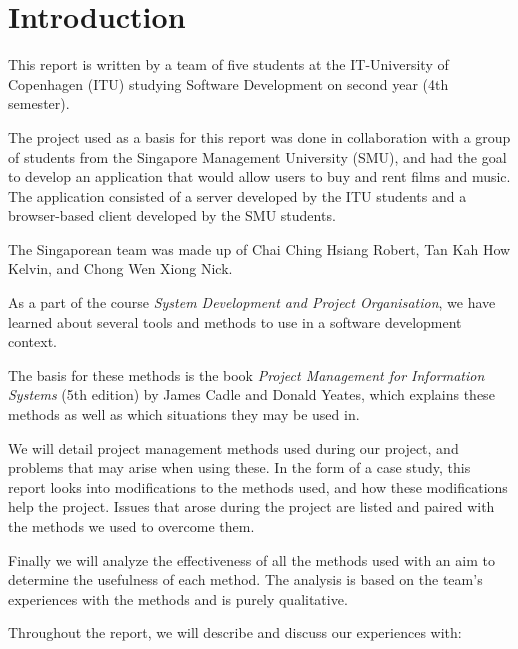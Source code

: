\section{Introduction}

This report is written by a team of five students at the IT-University of
Copenhagen (ITU) studying Software Development on second year (4th semester).

The project used as a basis for this report was done in collaboration with a
group of students from the Singapore Management University (SMU), and had the
goal to develop an application that would allow users to buy and rent films and
music. The application consisted of a server developed by the ITU students and
a browser-based client developed by the SMU students.

The Singaporean team was made up of Chai Ching Hsiang Robert, Tan Kah How
Kelvin, and Chong Wen Xiong Nick.

As a part of the course \emph{System Development and Project Organisation}, we
have learned about several tools and methods to use in a software development
context.

The basis for these methods is the book \emph{Project Management for
Information Systems} (5th edition) by James Cadle and Donald Yeates, which
explains these methods as well as which situations they may be used in.

We will detail project management methods used during our project, and problems
that may arise when using these. In the form of a case study, this report looks
into modifications to the methods used, and how these modifications help the
project. Issues that arose during the project are listed and paired with the
methods we used to overcome them.

Finally we will analyze the effectiveness of all the methods used with an aim
to determine the usefulness of each method. The analysis is based on the team’s
experiences with the methods and is purely qualitative.

Throughout the report, we will describe and discuss our experiences with:

